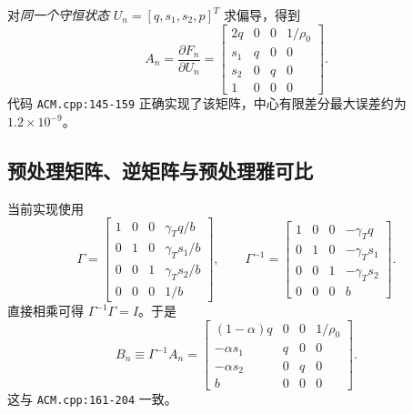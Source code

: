 \documentclass[UTF8,11pt,a4paper]{ctexart}
\newcommand{\code}[1]{\nolinkurl{#1}}
\begin{document}
对\emph{同一个守恒状态} $U_n=[q,s_1,s_2,p]^T$ 求偏导，得到
\begin{equation}
 A_n=\frac{\partial F_n}{\partial U_n}=
 \begin{bmatrix}
 2q&0&0&1/\rho_0\\
 s_1&q&0&0\\
 s_2&0&q&0\\
 1&0&0&0
 \end{bmatrix}.
 \label{eq:raw-jacobian}
\end{equation}
代码 \code{ACM.cpp:145-159} 正确实现了该矩阵，中心有限差分最大误差约为 $1.2\times10^{-9}$。

\noindent{}

\subsection{预处理矩阵、逆矩阵与预处理雅可比}

当前实现使用
\begin{equation}
 \Gamma=
 \begin{bmatrix}
 1&0&0&\gamma_T q/b\\
 0&1&0&\gamma_T s_1/b\\
 0&0&1&\gamma_T s_2/b\\
 0&0&0&1/b
 \end{bmatrix},\qquad
 \Gamma^{-1}=
 \begin{bmatrix}
 1&0&0&-\gamma_T q\\
 0&1&0&-\gamma_T s_1\\
 0&0&1&-\gamma_T s_2\\
 0&0&0&b
 \end{bmatrix}.
 \label{eq:gamma}
\end{equation}
直接相乘可得 $\Gamma^{-1}\Gamma=I$。于是
\begin{equation}
 B_n\equiv\Gamma^{-1}A_n=
 \begin{bmatrix}
 (1-\alpha)q&0&0&1/\rho_0\\
 -\alpha s_1&q&0&0\\
 -\alpha s_2&0&q&0\\
 b&0&0&0
 \end{bmatrix}.
 \label{eq:preconditioned-jacobian}
\end{equation}
这与 \code{ACM.cpp:161-204} 一致。
\end{document}
